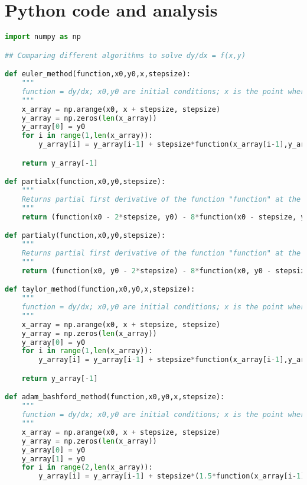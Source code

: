 \documentclass[a4paper,10pt]{article}
\title{}
\author{}
\date{}
\begin{document}
\section*{Python code and analysis}
\begin{lstlisting}[language=python]
import numpy as np

## Comparing different algorithms to solve dy/dx = f(x,y)

def euler_method(function,x0,y0,x,stepsize):
    """
    function = dy/dx; x0,y0 are initial conditions; x is the point where y needs to be calculated.
    """
    x_array = np.arange(x0, x + stepsize, stepsize)
    y_array = np.zeros(len(x_array))
    y_array[0] = y0
    for i in range(1,len(x_array)):
        y_array[i] = y_array[i-1] + stepsize*function(x_array[i-1],y_array[i-1])

    return y_array[-1]

def partialx(function,x0,y0,stepsize):
    """
    Returns partial first derivative of the function "function" at the point x0,y0 with respect to x by considering points, one and two steps on either side of x0.
    """
    return (function(x0 - 2*stepsize, y0) - 8*function(x0 - stepsize, y0) + 8*function(x0 + stepsize, y0) - function(x0 + 2*stepsize, y0))/(12*stepsize)

def partialy(function,x0,y0,stepsize):
    """
    Returns partial first derivative of the function "function" at the point x0,y0 with respect to y by considering points, one and two steps on either side of y0.
    """
    return (function(x0, y0 - 2*stepsize) - 8*function(x0, y0 - stepsize) + 8*function(x0, y0 + stepsize) - function(x0, y0 + 2*stepsize))/(12*stepsize)

def taylor_method(function,x0,y0,x,stepsize):
    """
    function = dy/dx; x0,y0 are initial conditions; x is the point where y needs to be calculated.
    """
    x_array = np.arange(x0, x + stepsize, stepsize)
    y_array = np.zeros(len(x_array))
    y_array[0] = y0
    for i in range(1,len(x_array)):
        y_array[i] = y_array[i-1] + stepsize*function(x_array[i-1],y_array[i-1]) + (stepsize**2.0)*(partialx(function,x_array[i-1],y_array[i-1],10**(-7)) + function(x_array[i-1],y_array[i-1])*partialy(function,x_array[i-1],y_array[i-1],10**(-7)))

    return y_array[-1]

def adam_bashford_method(function,x0,y0,x,stepsize):
    """
    function = dy/dx; x0,y0 are initial conditions; x is the point where y needs to be calculated.
    """
    x_array = np.arange(x0, x + stepsize, stepsize)
    y_array = np.zeros(len(x_array))
    y_array[0] = y0
    y_array[1] = y0
    for i in range(2,len(x_array)):
        y_array[i] = y_array[i-1] + stepsize*(1.5*function(x_array[i-1],y_array[i-1]) - 0.5*function(x_array[i-2],y_array[i-2]))


\end{lstlisting}
\end{document}
